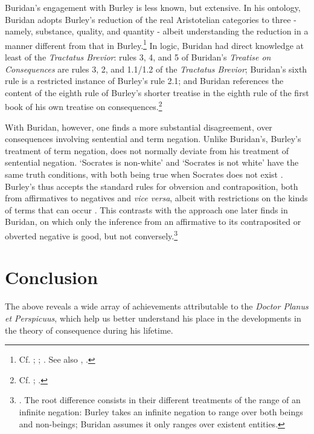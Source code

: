 	Buridan's engagement with Burley is less known, but extensive. In his ontology, Buridan adopts Burley's reduction of the real Aristotelian categories to three - namely, substance, quality, and quantity - albeit understanding the reduction in a manner different from that in Burley.\footnote{Cf. \cite[pp. 57-59, 204, 269-270]{Klima2009}; \cite[p. 13]{Read2016b}; \cite{DutilhNovaes2013}. See also \cite[p. 439]{Michael1985b}, \cite{Markowski1982}.} In logic, Buridan had direct knowledge at least of the \textit{Tractatus Brevior}: rules 3, 4, and 5 of Buridan's \textit{Treatise on Consequences} are rules 3, 2, and 1.1/1.2 of the \textit{Tractatus Brevior}; Buridan's sixth rule is a restricted instance of Burley's rule 2.1; and Buridan references the content of the eighth rule of Burley's shorter treatise in the eighth rule of the first book of his own treatise on consequences.\footnote{Cf. \cite[p. 212.29-31]{BurleyDPAL}; \cite[I. 8]{BuridanTC}.}
	
	With Buridan, however, one finds a more substantial disagreement, over consequences involving sentential and term negation. Unlike Buridan's, Burley's treatment of term negation, does not normally deviate from his treatment of sentential negation. `Socrates is non-white' and `Socrates is not white' have the same truth conditions, with both being true when Socrates does not exist \autocite[pp. 57.17-58.12; 215.6-21; 216.15-18]{BurleyDPAL}. Burley's thus accepts the standard rules for obversion and contraposition, both from affirmatives to negatives and \textit{vice versa}, albeit with restrictions on the kinds of terms that can occur \autocite[pp. 129-131, par. 73-81]{Green-Pedersen1980b}. This contrasts with the approach one later finds in Buridan, on which only the inference from an affirmative to its contraposited or obverted negative is good, but not conversely.\footnote{\cite[p. 85]{Buridan2015}. The root difference consists in their different treatments of the range of an infinite negation: Burley takes an infinite negation to range over both beings and non-beings; Buridan assumes it only ranges over existent entities.}
	\section{Conclusion}
	The above reveals a wide array of achievements attributable to the \textit{Doctor Planus et Perspicuus}, which help us better understand his place in the developments in the theory of consequence during his lifetime.
	
